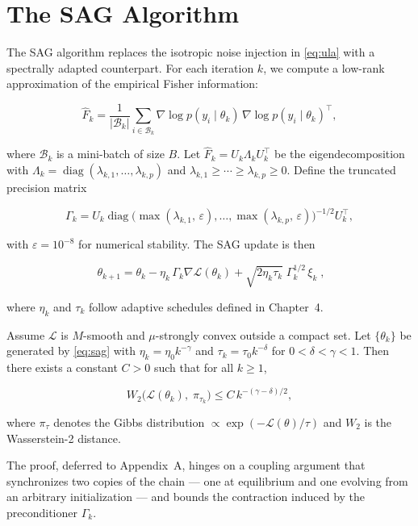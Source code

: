 \section{The SAG Algorithm}

The SAG algorithm replaces the isotropic noise injection in \eqref{eq:ula} with a spectrally adapted counterpart. For each iteration $k$, we compute a low-rank approximation of the empirical Fisher information:

\begin{equation}\label{eq:fisher}
\hat{F}_{k} = \frac{1}{|\mathcal{B}_{k}|}\sum_{i \in \mathcal{B}_{k}} \nabla\log p(y_{i}\mid\theta_{k})\,\nabla\log p(y_{i}\mid\theta_{k})^{\top},
\end{equation}

\noindent where $\mathcal{B}_{k}$ is a mini-batch of size $B$. Let $\hat{F}_{k} = U_{k}\Lambda_{k}U_{k}^{\top}$ be the eigendecomposition with $\Lambda_{k} = \operatorname{diag}(\lambda_{k,1}, \ldots, \lambda_{k,p})$ and $\lambda_{k,1} \ge \cdots \ge \lambda_{k,p} \ge 0$. Define the truncated precision matrix

\begin{equation}\label{eq:precision}
\Gamma_{k} = U_{k}\operatorname{diag}\bigl(\max(\lambda_{k,1},\,\varepsilon), \ldots, \max(\lambda_{k,p},\,\varepsilon)\bigr)^{-1/2} U_{k}^{\top},
\end{equation}

\noindent with $\varepsilon = 10^{-8}$ for numerical stability. The SAG update is then

\begin{equation}\label{eq:sag}
\boxed{\;\theta_{k+1} = \theta_{k} - \eta_{k}\,\Gamma_{k}\nabla\mathcal{L}(\theta_{k}) + \sqrt{2\eta_{k}\tau_{k}}\;\Gamma_{k}^{1/2}\,\xi_{k}\;},
\end{equation}

\noindent where $\eta_{k}$ and $\tau_{k}$ follow adaptive schedules defined in Chapter~4.

\begin{theorembox}[title={Convergence in $W_{2}$ Distance}]
Assume $\mathcal{L}$ is $M$-smooth and $\mu$-strongly convex outside a compact set. Let $\{\theta_{k}\}$ be generated by \eqref{eq:sag} with $\eta_{k} = \eta_{0}k^{-\gamma}$ and $\tau_{k} = \tau_{0}k^{-\delta}$ for $0 < \delta < \gamma < 1$. Then there exists a constant $C > 0$ such that for all $k \ge 1$,

\begin{equation}\label{eq:convergence}
W_{2}\bigl(\mathcal{L}(\theta_{k}),\; \pi_{\tau_{k}}\bigr) \le C\,k^{-(\gamma-\delta)/2},
\end{equation}

\noindent where $\pi_{\tau}$ denotes the Gibbs distribution $\propto \exp(-\mathcal{L}(\theta)/\tau)$ and $W_{2}$ is the Wasserstein-2 distance.
\end{theorembox}

The proof, deferred to Appendix~A, hinges on a coupling argument that synchronizes two copies of the chain --- one at equilibrium and one evolving from an arbitrary initialization --- and bounds the contraction induced by the preconditioner $\Gamma_{k}$.
